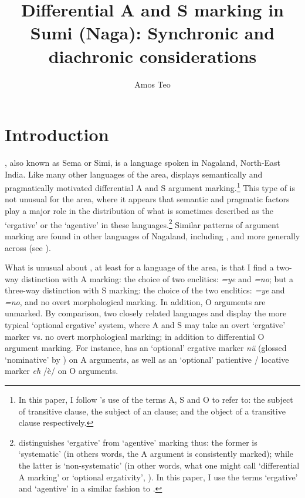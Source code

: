 \documentclass[output=paper]{LSP/langsci}
\author{Amos Teo\affiliation{University of Oregon}}
\title{Differential A and S marking in Sumi (Naga): Synchronic and diachronic considerations}
\begin{document}
\section{Introduction}
\label{13-sec:1}

, also known as Sema or Simi, is a  language spoken in Nagaland, North-East India. Like many other  languages of the area,  displays semantically and pragmatically motivated differential A and S argument marking.\footnote{In this paper, I follow \citet{Dixon1994Ergativity}’s use of the terms A, S and O to refer to: the subject of transitive clause, the subject of an  clause; and the object of a transitive clause respectively.} This type of  is not unusual for the area, where it appears that semantic and pragmatic factors play a major role in the distribution of what is sometimes described as the ‘ergative’ or the ‘agentive’ in these languages.\footnote{\citet{LaPolla1995Ergative} distinguishes ‘ergative’ from ‘agentive’ marking thus: the former is ‘systematic’ (in others words, the A argument is consistently marked); while the latter is ‘non-systematic’ (in other words, what one might call ‘differential A marking’ or ‘optional ergativity’, \eg  \citealt{Chelliahetal2012Optional,McGregor2010Optional}). In this paper, I use the terms ‘ergative’ and ‘agentive’ in a similar fashion to \citeauthor{LaPolla1995Ergative}.} 
Similar patterns of argument marking are found in other languages of Nagaland, including  \citep{Coupe2007Grammar,Coupe2011Pragmatic}, and more generally across  (see \citealt{DeLancey2011Optional,Chelliahetal2012Optional}).



What is unusual about , at least for a  language of the area, is that I find a two-way distinction with A marking: the choice of two enclitics: \textit{=ye} and \textit{=no}; but a three-way distinction with S marking: the choice of the two enclitics: \textit{=ye} and \textit{=no}, and no overt morphological marking. In addition, O arguments are unmarked. By comparison, two closely related languages  and  display the more typical ‘optional ergative’ system, where A and S may take an overt ‘ergative’ marker vs. no overt morphological marking; in addition to differential O argument marking. For instance,  has an ‘optional’ ergative marker \textit{nü} (glossed ‘nominative’ by \citealt{Kapfo2005Kheza}) on A arguments, as well as an ‘optional’ patientive / locative marker \textit{eh} /è/ on O arguments. 
\end{document}
